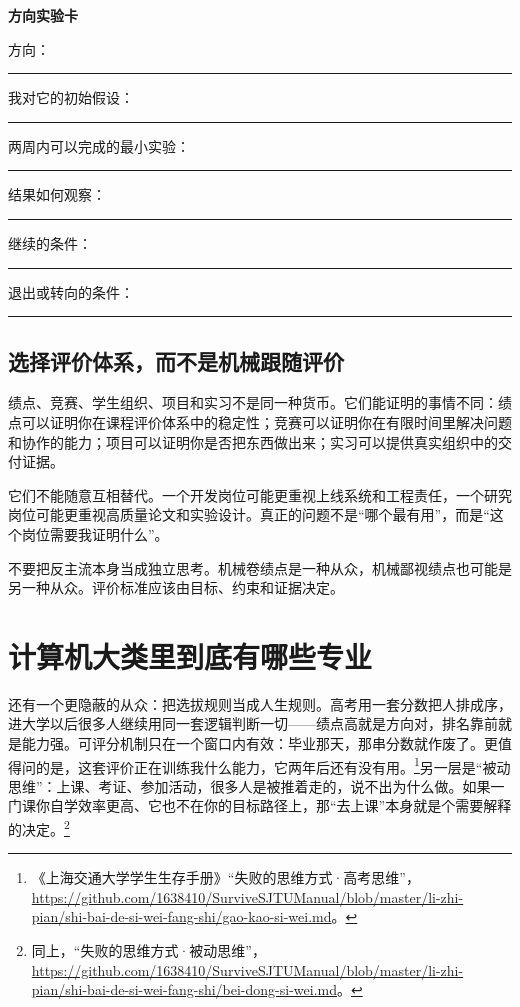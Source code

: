 \documentclass[UTF8,zihao=5,openany]{ctexbook}
\begin{document}
\begin{toolbox}
\textbf{方向实验卡}

方向：\rule{0.7\textwidth}{0.4pt}

我对它的初始假设：\rule{0.58\textwidth}{0.4pt}

两周内可以完成的最小实验：\rule{0.48\textwidth}{0.4pt}

结果如何观察：\rule{0.65\textwidth}{0.4pt}

继续的条件：\rule{0.7\textwidth}{0.4pt}

退出或转向的条件：\rule{0.52\textwidth}{0.4pt}
\end{toolbox}

\section{选择评价体系，而不是机械跟随评价}
绩点、竞赛、学生组织、项目和实习不是同一种货币。它们能证明的事情不同：绩点可以证明你在课程评价体系中的稳定性；竞赛可以证明你在有限时间里解决问题和协作的能力；项目可以证明你是否把东西做出来；实习可以提供真实组织中的交付证据。

它们不能随意互相替代。一个开发岗位可能更重视上线系统和工程责任，一个研究岗位可能更重视高质量论文和实验设计。真正的问题不是“哪个最有用”，而是“这个岗位需要我证明什么”。

\begin{warningbox}
不要把反主流本身当成独立思考。机械卷绩点是一种从众，机械鄙视绩点也可能是另一种从众。评价标准应该由目标、约束和证据决定。
\end{warningbox}

\chapter{计算机大类里到底有哪些专业}

还有一个更隐蔽的从众：把选拔规则当成人生规则。高考用一套分数把人排成序，进大学以后很多人继续用同一套逻辑判断一切——绩点高就是方向对，排名靠前就是能力强。可评分机制只在一个窗口内有效：毕业那天，那串分数就作废了。更值得问的是，这套评价正在训练我什么能力，它两年后还有没有用。\footnote{《上海交通大学学生生存手册》“失败的思维方式·高考思维”，\url{https://github.com/1638410/SurviveSJTUManual/blob/master/li-zhi-pian/shi-bai-de-si-wei-fang-shi/gao-kao-si-wei.md}。}另一层是“被动思维”：上课、考证、参加活动，很多人是被推着走的，说不出为什么做。如果一门课你自学效率更高、它也不在你的目标路径上，那“去上课”本身就是个需要解释的决定。\footnote{同上，“失败的思维方式·被动思维”，\url{https://github.com/1638410/SurviveSJTUManual/blob/master/li-zhi-pian/shi-bai-de-si-wei-fang-shi/bei-dong-si-wei.md}。}
\end{document}
